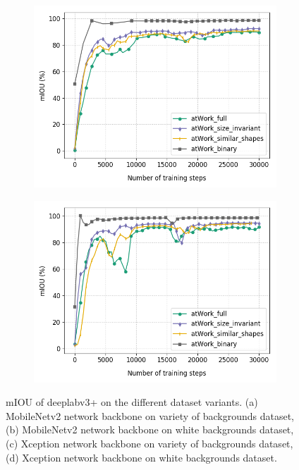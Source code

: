 \begin{figure}
\begin{subfigure}{.5\textwidth}
			\includegraphics[width=1\linewidth]{images/xcep_4vars}
			\label{Fig:xcepvarsa}
			\caption{}
		\end{subfigure}
		\begin{subfigure}{.5\textwidth}
			\centering
			\includegraphics[width=1\linewidth]{images/xcep_4vars_white}
			\label{Fig:xcepvarsb}
			\caption{}
		\end{subfigure}
		\caption{mIOU of deeplabv3+ on the different dataset variants. (a) MobileNetv2 network backbone on variety of backgrounds dataset, (b) MobileNetv2 network backbone on white backgrounds dataset, (c) Xception network backbone on variety of backgrounds dataset, (d) Xception network backbone on white backgrounds dataset.}
		\label{Fig:vars}
	\end{figure}
	
